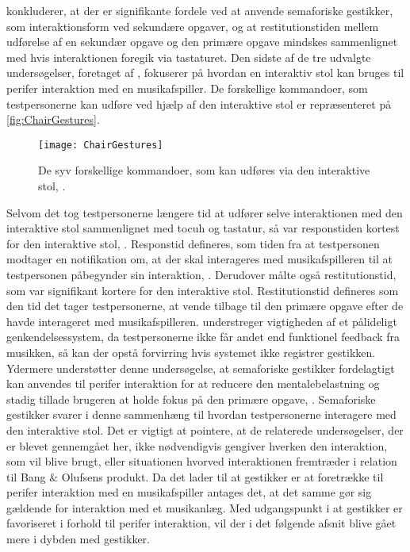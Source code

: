 \textcite[s. 1964]{PDF:AStudyOnTheUseOfSemaphoricGestures} konkluderer, at der er signifikante fordele ved at anvende semaforiske gestikker, som interaktionsform ved sekundære opgaver, og at restitutionstiden mellem udførelse af en sekundær opgave og den primære opgave mindskes sammenlignet med hvis interaktionen foregik via tastaturet.\blankline
%
Den sidste af de tre udvalgte undersøgelser, foretaget af \textcite[ss. 6-9]{PDF:AChairAsUbiquitousInputDevice}, fokuserer på hvordan en interaktiv stol kan bruges til perifer interaktion med en musikafspiller. De forskellige kommandoer, som testpersonerne kan udføre ved hjælp af den interaktive stol er repræsenteret på \autoref{fig:ChairGestures}. 
%
\begin{figure}[H]
	\centering
	\texttt{[image: ChairGestures]}
	\caption{De syv forskellige kommandoer, som kan udføres via den interaktive stol, \parencite[s. 3]{PDF:AChairAsUbiquitousInputDevice}.}
	\label{fig:ChairGestures}
\end{figure}
\noindent
%
Selvom det tog testpersonerne længere tid at udfører selve interaktionen med den interaktive stol sammenlignet med tocuh og tastatur, så var responstiden kortest for den interaktive stol, \textcite[s. 7]{PDF:AChairAsUbiquitousInputDevice}. Responstid defineres, som tiden fra at testpersonen modtager en notifikation om, at der skal interageres med musikafspilleren til at testpersonen påbegynder sin interaktion, \parencite[s. 6]{PDF:AChairAsUbiquitousInputDevice}. Derudover målte \textcite[s. 7]{PDF:AChairAsUbiquitousInputDevice} også restitutionstid, som var signifikant kortere for den interaktive stol. Restitutionstid defineres som den tid det tager testpersonerne, at vende tilbage til den primære opgave efter de havde interageret med musikafspilleren. \textcite[s. 8]{PDF:AChairAsUbiquitousInputDevice} understreger vigtigheden af et pålideligt genkendelsessystem, da testpersonerne ikke får andet end funktionel feedback fra musikken, så kan der opstå forvirring hvis systemet ikke registrer gestikken. Ydermere understøtter denne undersøgelse, at semaforiske gestikker fordelagtigt kan anvendes til perifer interaktion for at reducere den mentalebelastning og stadig tillade brugeren at holde fokus på den primære opgave, \parencite[s. 8]{PDF:AChairAsUbiquitousInputDevice}. Semaforiske gestikker svarer i denne sammenhæng til hvordan testpersonerne interagere med den interaktive stol. \blankline
%
Det er vigtigt at pointere, at de relaterede undersøgelser, der er blevet gennemgået her, ikke nødvendigvis gengiver hverken den interaktion, som vil blive brugt, eller situationen hvorved interaktionen fremtræder i relation til Bang $\&$ Olufsens produkt. Da det lader til at gestikker er at foretrække til perifer interaktion med en musikafspiller antages det, at det samme gør sig gældende for interaktion med et musikanlæg. Med udgangspunkt i at gestikker er favoriseret i forhold til perifer interaktion, vil der i det følgende afsnit blive gået mere i dybden med gestikker. 


